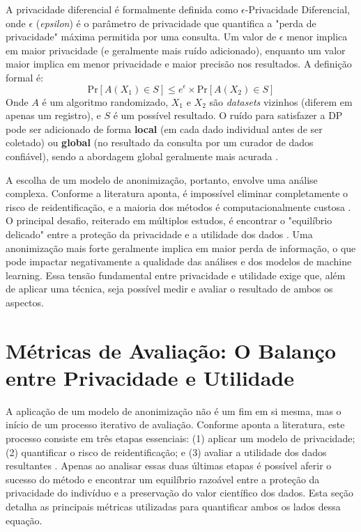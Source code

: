 A privacidade diferencial é formalmente definida como $\epsilon$-Privacidade Diferencial, onde $\epsilon$ (\textit{epsilon}) é o parâmetro de privacidade que quantifica a "perda de privacidade" máxima permitida por uma consulta. Um valor de $\epsilon$ menor implica em maior privacidade (e geralmente mais ruído adicionado), enquanto um valor maior implica em menor privacidade e maior precisão nos resultados. A definição formal é:
$$\text{Pr}[A(X_1) \in S] \leq e^{\epsilon} \times \text{Pr}[A(X_2) \in S]$$
Onde $A$ é um algoritmo randomizado, $X_1$ e $X_2$ são \textit{datasets} vizinhos (diferem em apenas um registro), e $S$ é um possível resultado. O ruído para satisfazer a DP pode ser adicionado de forma \textbf{local} (em cada dado individual antes de ser coletado) ou \textbf{global} (no resultado da consulta por um curador de dados confiável), sendo a abordagem global geralmente mais acurada \cite{Olatunji2024}.

A escolha de um modelo de anonimização, portanto, envolve uma análise complexa. Conforme a literatura aponta, é impossível eliminar completamente o risco de reidentificação, e a maioria dos métodos é computacionalmente custosa \cite{Sepas2022}. O principal desafio, reiterado em múltiplos estudos, é encontrar o "equilíbrio delicado" entre a proteção da privacidade e a utilidade dos dados \cite{Vovk2023, Olatunji2024}. Uma anonimização mais forte geralmente implica em maior perda de informação, o que pode impactar negativamente a qualidade das análises e dos modelos de machine learning. Essa tensão fundamental entre privacidade e utilidade exige que, além de aplicar uma técnica, seja possível medir e avaliar o resultado de ambos os aspectos.

\section{Métricas de Avaliação: O Balanço entre Privacidade e Utilidade}
\label{sec:fund-metricas}

A aplicação de um modelo de anonimização não é um fim em si mesma, mas o início de um processo iterativo de avaliação. Conforme aponta a literatura, este processo consiste em três etapas essenciais: (1) aplicar um modelo de privacidade; (2) quantificar o risco de reidentificação; e (3) avaliar a utilidade dos dados resultantes \cite{Ferrao2022}. Apenas ao analisar essas duas últimas etapas é possível aferir o sucesso do método e encontrar um equilíbrio razoável entre a proteção da privacidade do indivíduo e a preservação do valor científico dos dados. Esta seção detalha as principais métricas utilizadas para quantificar ambos os lados dessa equação.

